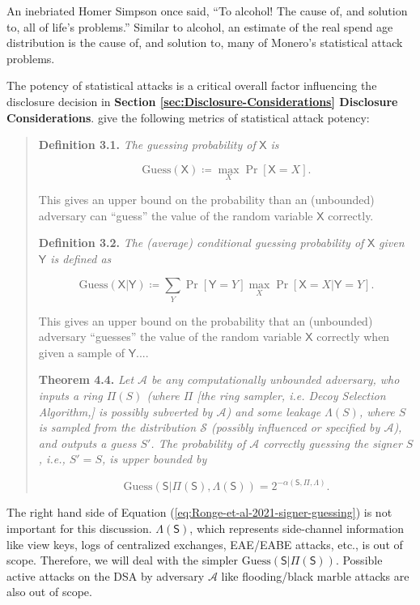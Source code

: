 \documentclass[english]{article}
\begin{document}
An inebriated Homer Simpson once said, ``To alcohol! The cause of,
and solution to, all of life's problems.'' Similar to alcohol, an
estimate of the real spend age distribution is the cause of, and solution
to, many of Monero's statistical attack problems.

The potency of statistical attacks is a critical overall factor influencing
the disclosure decision in \textbf{Section \ref{sec:Disclosure-Considerations}
Disclosure Considerations}. \cite{Ronge2021} give the following metrics
of statistical attack potency:
\begin{quote}
\textbf{Definition 3.1.} \textit{The guessing probability of }$\mathsf{X}$\textit{
is}

\[
\mathrm{Guess}(\mathsf{X})\coloneqq\underset{X}{\max}\Pr\left[\mathsf{X}=X\right].
\]

This gives an upper bound on the probability than an (unbounded) adversary
can ``guess'' the value of the random variable $\mathsf{X}$ correctly.

\textbf{Definition 3.2.} \textit{The (average) conditional guessing
probability of }$\mathsf{X}$\textit{ given $\mathsf{Y}$ is defined
as}

\[
\mathrm{Guess}(\mathsf{X}|\mathsf{Y})\coloneqq\sum_{Y}\Pr\left[\mathsf{Y}=Y\right]\underset{X}{\max}\Pr\left[\mathsf{X}=X|\mathsf{Y}=Y\right].
\]

This gives an upper bound on the probability that an (unbounded) adversary
``guesses'' the value of the random variable $\mathsf{X}$ correctly
when given a sample of $\mathsf{Y}$....

\textbf{Theorem 4.4.} \textit{Let $\mathcal{A}$ be any computationally
unbounded adversary, who inputs a ring $\Pi(S)$ (where $\Pi$ {[}the
ring sampler, i.e. Decoy Selection Algorithm,{]} is possibly subverted
by $\mathcal{A}$) and some leakage $\Lambda(S)$, where $S$ is sampled
from the distribution $\mathcal{S}$ (possibly influenced or specified
by $\mathcal{A}$), and outputs a guess $S'$. The probability of
$\mathcal{A}$ correctly guessing the signer $S$, i.e., $S'=S$,
is upper bounded by}

\begin{equation}
\mathrm{Guess}\left(\mathsf{S}|\Pi(\mathsf{S}),\Lambda(\mathsf{S})\right)=2^{-\alpha(\mathsf{S},\Pi,\Lambda)}.\label{eq:Ronge-et-al-2021-signer-guessing}
\end{equation}
\end{quote}
The right hand side of Equation (\ref{eq:Ronge-et-al-2021-signer-guessing})
is not important for this discussion. $\Lambda(\mathsf{S})$, which
represents side-channel information like view keys, logs of centralized
exchanges, EAE/EABE attacks, etc., is out of scope. Therefore, we
will deal with the simpler $\mathrm{Guess}\left(\mathsf{S}|\Pi(\mathsf{S})\right)$.
Possible active attacks on the DSA by adversary \textit{$\mathcal{A}$}
like flooding/black marble attacks are also out of scope.
\end{document}
